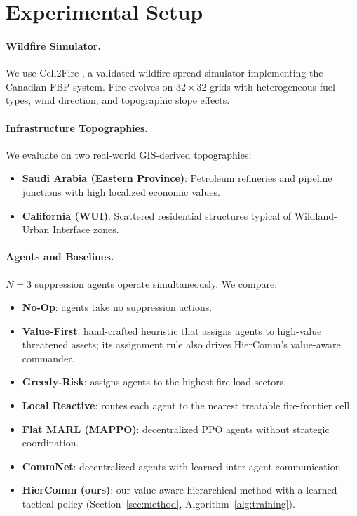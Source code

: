\documentclass[letterpaper]{article}
\begin{document}
\section{Experimental Setup}
\label{sec:setup}

\paragraph{Wildfire Simulator.}
We use Cell2Fire \citep{pais2021cell2fire}, a validated wildfire spread simulator implementing the Canadian FBP system. Fire evolves on $32 \times 32$ grids with heterogeneous fuel types, wind direction, and topographic slope effects.

\paragraph{Infrastructure Topographies.}
We evaluate on two real-world GIS-derived topographies:
\begin{itemize}
    \item \textbf{Saudi Arabia (Eastern Province)}: Petroleum refineries and pipeline junctions with high localized economic values.
    \item \textbf{California (WUI)}: Scattered residential structures typical of Wildland-Urban Interface zones.
\end{itemize}

\paragraph{Agents and Baselines.}
$N = 3$ suppression agents operate simultaneously. We compare:
\begin{itemize}
    \item \textbf{No-Op}: agents take no suppression actions.
    \item \textbf{Value-First}: hand-crafted heuristic that assigns agents to high-value threatened assets; its assignment rule also drives HierComm's value-aware commander.
    \item \textbf{Greedy-Risk}: assigns agents to the highest fire-load sectors.
    \item \textbf{Local Reactive}: routes each agent to the nearest treatable fire-frontier cell.
    \item \textbf{Flat MARL (MAPPO)}: decentralized PPO agents without strategic coordination.
    \item \textbf{CommNet}: decentralized agents with learned inter-agent communication.
    \item \textbf{HierComm (ours)}: our value-aware hierarchical method with a learned tactical policy (Section~\ref{sec:method}, Algorithm~\ref{alg:training}).
\end{itemize}
\end{document}
